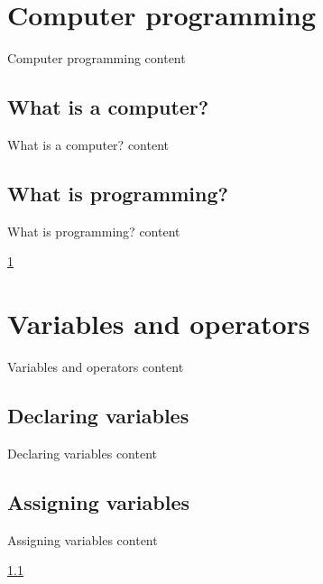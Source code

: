 \chapter{Computer programming}
\label{computer_programing}
Computer programming content

\section{What is a computer?}
\label{what_is_computer}
What is a computer? content

\section{What is programming?}
\label{what_is_programing}
What is programming? content

\ref{computer_programing}
\pageref{declaring_variables}

\chapter{Variables and operators}
\label{variables_and_operators}
Variables and operators content

\section{Declaring variables}
\label{declaring_variables}
Declaring variables content

\section{Assigning variables}
\label{assigning_variables}
Assigning variables content

\ref{what_is_computer}
\pageref{assigning_variables}
